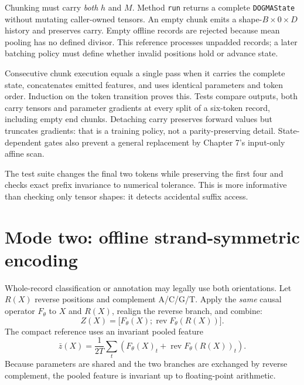Chunking must carry \emph{both} $h$ and $M$. Method \texttt{run} returns a
complete \texttt{DOGMAState} without mutating caller-owned tensors. An empty
chunk emits a shape-$B\times0\times D$ history and preserves carry. Empty
offline records are rejected because mean pooling has no defined divisor.
This reference processes unpadded records; a later batching policy must define
whether invalid positions hold or advance state.


Consecutive chunk execution equals a single pass when it carries the complete
state, concatenates emitted features, and uses identical parameters and token
order. Induction on the token transition proves this. Tests compare outputs,
both carry tensors and parameter gradients at every split of a six-token record,
including empty end chunks. Detaching carry preserves forward values but truncates
gradients: that is a training policy, not a parity-preserving detail.
State-dependent gates also prevent a general replacement by Chapter 7's
input-only affine scan.

The test suite changes the final two tokens while preserving the first four and
checks exact prefix invariance to numerical tolerance. This is more informative than
checking only tensor shapes: it detects accidental suffix access.

\section{Mode two: offline strand-symmetric encoding}

Whole-record classification or annotation may legally use both orientations. Let
$R(X)$ reverse positions and complement A/C/G/T. Apply the \emph{same} causal
operator $F_\theta$ to $X$ and $R(X)$, realign the reverse branch, and combine:
\[
Z(X)=\big[F_\theta(X);\operatorname{rev}F_\theta(R(X))\big].
\]
The compact reference uses an invariant pooled feature
\[
\bar z(X)=\frac{1}{2T}\sum_t
\left(F_\theta(X)_t+
\operatorname{rev}F_\theta(R(X))_t\right).
\label{evod22:dual}
\]
Because parameters are shared and the two branches are exchanged by reverse
complement, the pooled feature is invariant up to floating-point arithmetic.


